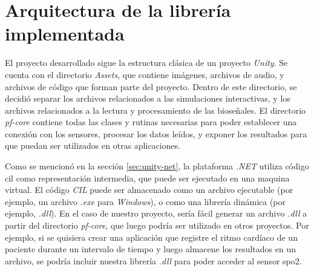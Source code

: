 \section{Arquitectura de la librería implementada}

El proyecto desarrollado sigue la estructura clásica de un proyecto \emph{Unity}. Se cuenta con el directorio \emph{Assets}, que contiene imágenes, archivos de audio, y archivos de código que forman parte del proyecto. Dentro de este directorio, se decidió separar los archivos relacionados a las simulaciones interactivas, y los archivos relacionados a la lectura y procesamiento de las bioseñales. El directorio \emph{pf-core} contiene todas las clases y rutinas necesarias para poder establecer una conexión con los sensores, procesar los datos leídos, y exponer los resultados para que puedan ser utilizados en otras aplicaciones.

Como se mencionó en la sección \ref{sec:unity-net}, la plataforma \emph{.NET} utiliza código \acrshort{cil} como representación intermedia, que puede ser ejecutado en una maquina virtual. El código \emph{CIL} puede ser almacenado como un archivo ejecutable (por ejemplo, un archivo \emph{.exe} para \emph{Windows}), o como una librería dinámica (por ejemplo, \emph{.dll}). En el caso de nuestro proyecto, sería fácil generar un archivo \emph{.dll} a partir del directorio \emph{pf-core}, que luego podría ser utilizado en otros proyectos. Por ejemplo, si se quisiera crear una aplicación que registre el ritmo cardíaco de un paciente durante un intervalo de tiempo y luego almacene los resultados en un archivo, se podría incluir nuestra librería \emph{.dll} para poder acceder al sensor \acrshort{spo2}.
